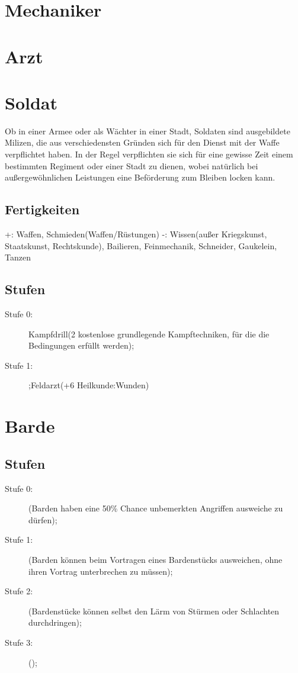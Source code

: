 \documentclass[a4paper,12pt,oneside]{book}
\begin{document}
\section{Mechaniker}
\section{Arzt}
\section{Soldat}
Ob in einer Armee oder als Wächter in einer Stadt, Soldaten sind ausgebildete Milizen, die aus verschiedensten Gründen sich für den Dienst mit der Waffe verpflichtet haben. In der Regel verpflichten sie sich für eine gewisse Zeit einem bestimmten Regiment oder einer Stadt zu dienen, wobei natürlich bei außergewöhnlichen Leistungen eine Beförderung zum Bleiben locken kann.
\subsection{Fertigkeiten}
+: Waffen, Schmieden(Waffen/Rüstungen)
-: Wissen(außer Kriegskunst, Staatskunst, Rechtskunde), Bailieren, Feinmechanik, Schneider, Gaukelein, Tanzen
\subsection{Stufen}
\begin{description}
\item[Stufe 0:]Kampfdrill(2 kostenlose grundlegende Kampftechniken, für die die Bedingungen erfüllt werden);
\item[Stufe 1:];Feldarzt(+6 Heilkunde:Wunden)
\end{description}
\section{Barde}
\subsection{Stufen}
\begin{description}
\item[Stufe 0:](Barden haben eine 50\% Chance unbemerkten Angriffen ausweiche zu dürfen); 
\item[Stufe 1:](Barden können beim Vortragen eines Bardenstücks ausweichen, ohne ihren Vortrag unterbrechen zu müssen);
\item[Stufe 2:](Bardenstücke können selbst den Lärm von Stürmen oder Schlachten durchdringen);
\item[Stufe 3:]();
\end{description}
\end{document}
